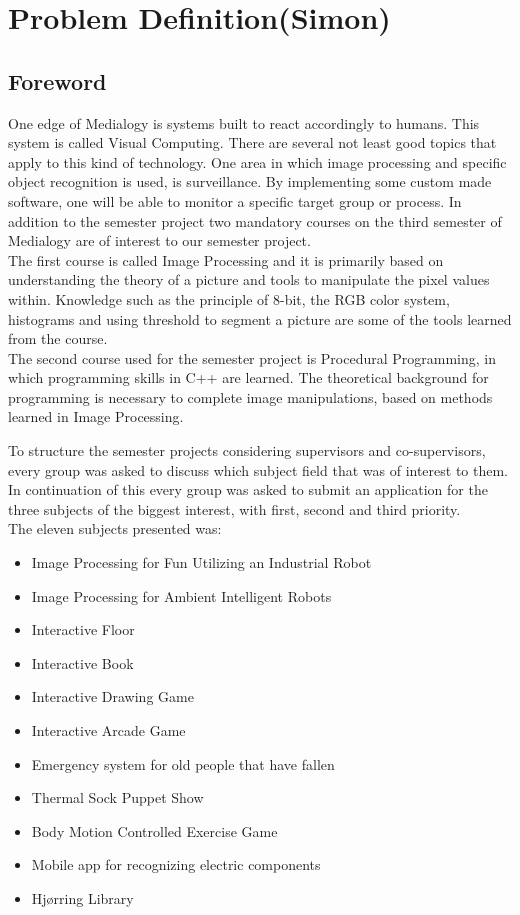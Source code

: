 
\chapter{Problem Definition(Simon)}
\section{Foreword}
One edge of Medialogy is systems built to react accordingly to humans. This system is called Visual Computing. There are several not least good topics that apply to this kind of technology. One area in which image processing and specific object recognition is used, is surveillance. By implementing some custom made software, one will be able to monitor a specific target group or process. In addition to the semester project two mandatory courses on the third semester of Medialogy are of interest to our semester project.\\
The first course is called Image Processing and it is primarily based on understanding the theory of a picture and tools to manipulate the pixel values within. Knowledge such as the principle of 8-bit, the RGB color system, histograms and using threshold to segment a picture are some of the tools learned from the course.\\
The second course used for the semester project is Procedural Programming, in which programming skills in C++ are learned. The theoretical background for programming is necessary to complete image manipulations, based on methods learned in Image Processing.

To structure the semester projects considering supervisors and co-supervisors, every group was asked to discuss which subject field that was of interest to them. In continuation of this every group was asked to submit an application for the three subjects of the biggest interest, with first, second and third priority.\\
The eleven subjects presented was:

\begin{itemize}
\item Image Processing for Fun Utilizing an Industrial Robot
\item Image Processing for Ambient Intelligent Robots
\item Interactive Floor
\item Interactive Book
\item Interactive Drawing Game
\item Interactive Arcade Game
\item Emergency system for old people that have fallen
\item Thermal Sock Puppet Show
\item Body Motion Controlled Exercise Game
\item Mobile app for recognizing electric components
\item Hj{\o}rring Library
\end{itemize}

